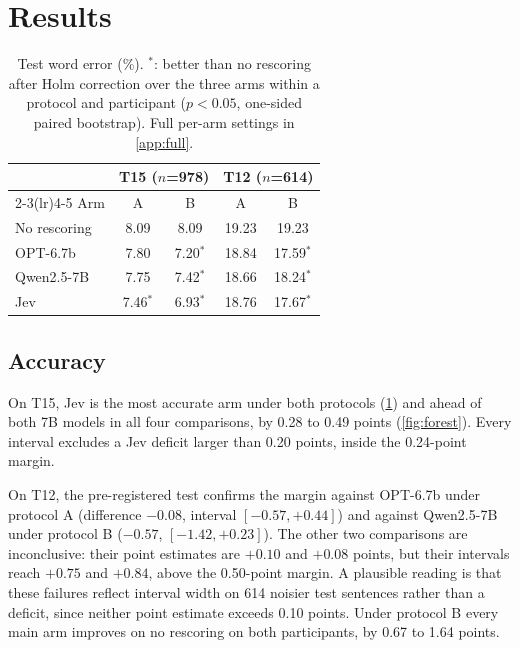 \documentclass[11pt]{article}
\begin{document}
\section{Results}
\label{sec:results}


\begin{table}[t]
\centering\small
\setlength{\tabcolsep}{4pt}
\begin{tabular}{lcccc}
\toprule
& \multicolumn{2}{c}{T15 ($n$=978)} & \multicolumn{2}{c}{T12 ($n$=614)} \\
\cmidrule(lr){2-3}\cmidrule(lr){4-5}
Arm & A & B & A & B \\
\midrule
No rescoring & 8.09 & 8.09 & 19.23 & 19.23 \\
OPT-6.7b & 7.80 & 7.20$^*$ & 18.84 & 17.59$^*$ \\
Qwen2.5-7B & 7.75 & 7.42$^*$ & 18.66 & 18.24$^*$ \\
Jev & 7.46$^*$ & 6.93$^*$ & 18.76 & 17.67$^*$ \\
\bottomrule
\end{tabular}
\caption{Test word error (\%). $^*$: better than no rescoring after Holm correction over the three
arms within a protocol and participant ($p<0.05$, one-sided paired bootstrap). Full per-arm settings
in \cref{app:full}.}
\label{tab:wer}
\end{table}

\subsection{Accuracy}
\label{sec:acc}

On T15, Jev is the most accurate arm under both protocols (\cref{tab:wer}) and ahead of both 7B
models in all four comparisons, by 0.28 to 0.49 points (\cref{fig:forest}). Every interval excludes a
Jev deficit larger than 0.20 points, inside the 0.24-point margin.

On T12, the pre-registered test confirms the margin against OPT-6.7b under protocol A (difference
$-0.08$, interval $[-0.57, +0.44]$) and against Qwen2.5-7B under protocol B ($-0.57$,
$[-1.42, +0.23]$). The other two comparisons are inconclusive: their point estimates are $+0.10$ and
$+0.08$ points, but their intervals reach $+0.75$ and $+0.84$, above the 0.50-point margin. A
plausible reading is that these failures reflect interval width on 614 noisier test sentences
rather than a deficit, since neither point estimate exceeds 0.10 points. Under
protocol B every main arm improves on no rescoring on both participants, by 0.67 to 1.64 points.
\end{document}
